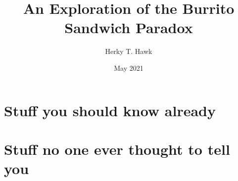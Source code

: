 \documentclass[letterpaper, 11pt]{uiowa-thesis}
\title{An Exploration of the Burrito Sandwich Paradox}
\author{Herky T. Hawk}
\date{May 2021}
\begin{document}
\titlepage

\copyrightPage

\frontmatter








\tableofcontents

\listoffigures

\listoftables



\mainmatter




\appendix

\chapter{Stuff you should know already}
\lipsum[100-120]

\chapter{Stuff no one ever thought to tell you}
\lipsum[121-140]

\backmatter

\printbibliography
\end{document}
